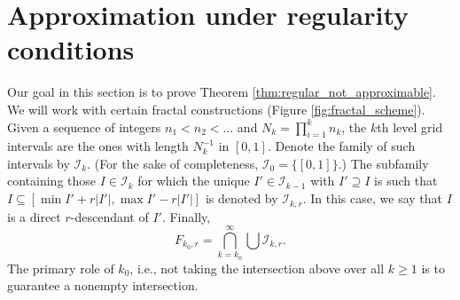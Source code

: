 \documentclass{article}
\theoremstyle{definition}
\begin{document}
\section{Approximation under regularity conditions} \label{sec:regular_approx}

Our goal in this section is to prove Theorem \ref{thm:regular_not_approximable}.
We will work with certain fractal constructions (Figure \ref{fig:fractal_scheme}). Given a sequence of integers $n_1< n_2< \dots $ and $N_k=\prod_{i=1}^{k}n_k$, the $k$th level grid intervals are the ones with length $N_k^{-1}$ in $[0, 1]$. Denote the family of such intervals by $\mathcal{I}_k$. (For the sake of completeness, $\mathcal{I}_0=\{[0, 1]\}$.) The subfamily containing those $I\in \mathcal{I}_k$ for which the unique $I'\in \mathcal{I}_{k-1}$ with $I'\supseteq I$ is such that $I\subseteq [\min I' + r|I'|, \max I'-r|I'|]$ is denoted by $\mathcal{I}_{k, r}$. In this case, we say that $I$ is a direct $r$-descendant of $I'$. Finally,
$$F_{k_0, r} = \bigcap_{k=k_0}^{\infty}\bigcup\mathcal{I}_{k, r}.$$
The primary role of $k_0$, i.e., not taking the intersection above over all \(k\geq1\) is to guarantee a nonempty intersection. 
\end{document}

